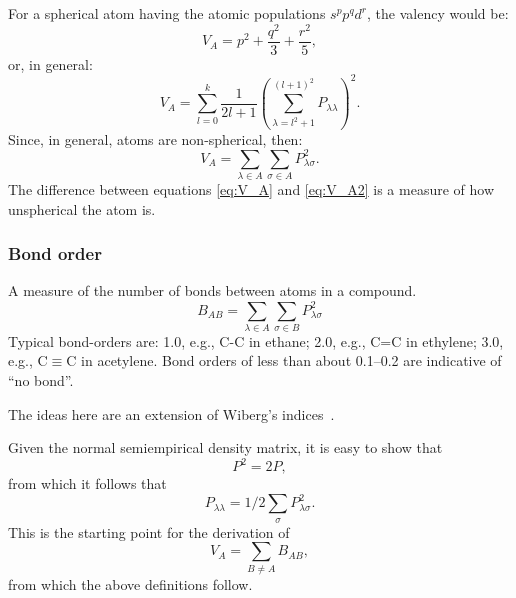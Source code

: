 For a spherical atom having the atomic populations $s^pp^qd^r$, the valency
would be:
\begin{equation}
V_A=p^2+\frac{q^2}{3}+\frac{r^2}{5},
\end{equation}
or, in general:
\begin{equation}
V_A = \sum_{l=0}^{k} \label{eq:V_A}
\frac{1}{2l+1}(\sum_{\lambda=l^2+1}^{(l+1)^2}P_{\lambda\lambda})^2.
\end{equation}
Since, in general, atoms are non-spherical, then:
\begin{equation} 
V_A=\sum_{\lambda\in A}\sum_{\sigma\in A}P_{\lambda\sigma}^2 \label{eq:V_A2}.
\end{equation}
The difference between equations \ref{eq:V_A} and \ref{eq:V_A2} is a measure of how
unspherical the atom is.

\subsubsection{Bond order}
A measure of the number of bonds between atoms in a compound.
\begin{equation}
B_{AB}=\sum_{\lambda\in A}\sum_{\sigma\in B}P_{\lambda\sigma}^2
\end{equation}
Typical bond-orders are: 1.0, e.g.,  C-C in ethane; 2.0, e.g.,  C=C  in
ethylene; 3.0, e.g.,  C$\equiv$C in acetylene.  Bond orders of less than about
0.1--0.2 are indicative of ``no bond''.

The ideas here are an extension of Wiberg's indices~\cite{wiberg}.

Given the normal semiempirical density matrix, it is easy to show that
\begin{equation}
P^2=2P,
\end{equation}
from which it follows that
\begin{equation}
P_{\lambda\lambda}=1/2\sum_{\sigma}P_{\lambda\sigma}^2.
\end{equation}
This is the starting point for the derivation of
\begin{equation}
V_A=\sum_{B\neq A}B_{AB},
\end{equation}
from which the above definitions follow.


